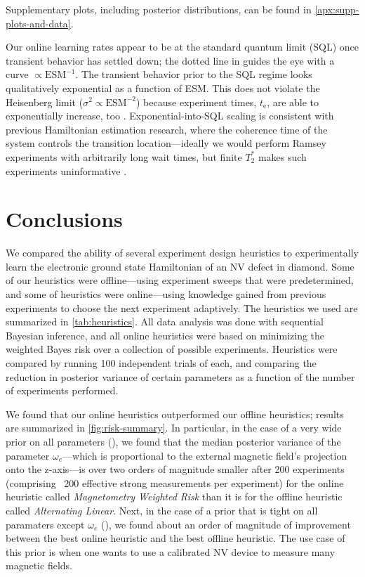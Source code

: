 \documentclass[aps,nofootinbib,twocolumn,superscriptaddress]{revtex4}
\newcommand{\te}{t_\text{e}}
\begin{document}
Supplementary plots, including posterior distributions, can be
found in \autoref{apx:supp-plots-and-data}.

Our online
learning rates appear to be at the standard quantum limit (SQL)
once transient
behavior has settled down; the dotted line in
 guides the eye with a
curve $\propto\text{ESM}^{-1}$.
The transient behavior prior to the SQL regime
looks qualitatively exponential as a function of ESM.
This does not violate the Heisenberg limit
($\sigma^2\propto \text{ESM}^{-2}$) because experiment times,
$\te$, are able to exponentially increase, too
 \cite{sergeevich_characterization_2011}.
Exponential-into-SQL scaling is consistent with previous
Hamiltonian estimation research, where the coherence time of the system
controls the transition location---ideally we would
perform Ramsey experiments with arbitrarily long wait times, but
finite $T_2^*$ makes such experiments uninformative
\cite{ferrie_how_2013}.


\section{Conclusions}
\label{sec:conclusions}

We compared the ability of several experiment design heuristics to
experimentally learn the electronic ground state Hamiltonian of an
NV defect in diamond.
Some of our heuristics were offline---using experiment sweeps that were
predetermined, and some of heuristics were online---using knowledge gained from
previous experiments to choose the next experiment adaptively.
The heuristics we used are summarized in \autoref{tab:heuristics}.
All data analysis was done with sequential Bayesian inference,
and all online heuristics were based on minimizing the
weighted Bayes risk over a collection of possible experiments.
Heuristics were compared by running 100 independent trials of each, and comparing
the reduction in posterior variance of certain parameters as a function of
the number of experiments performed.

We found that our online heuristics
outperformed our offline heuristics; results are summarized in
\autoref{fig:risk-summary}.
In particular, in the case of a very wide prior on all parameters
(), we found that the
median posterior variance of the parameter $\omega_e$---which is proportional
to the external magnetic field's projection onto the z-axis---is over two
orders of magnitude smaller after 200 experiments (comprising ~200 effective
strong measurements per experiment) for the online heuristic called
\emph{Magnetometry Weighted Risk} than
it is for the offline heuristic called \emph{Alternating Linear}.
Next, in the case of a prior that is tight on all paramaters except $\omega_e$
(), we found about an order of
magnitude of improvement between the best online heuristic and the
best offline heuristic.
The use case of this prior is when one wants to use a calibrated NV
device to measure many magnetic fields.
\end{document}
